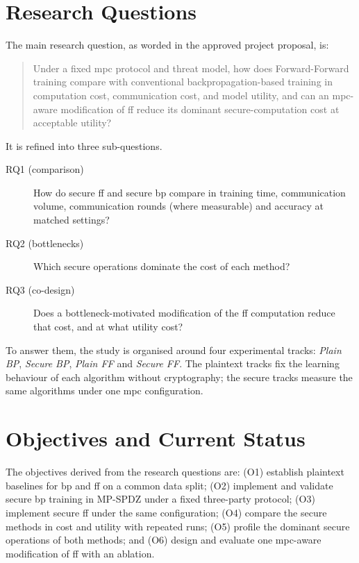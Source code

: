 \section{Research Questions}\label{sec:intro-rq}
The main research question, as worded in the approved project proposal, is:

\begin{quote}
Under a fixed \ac{mpc} protocol and threat model, how does Forward-Forward training compare with conventional backpropagation-based training in computation cost, communication cost, and model utility, and can an \ac{mpc}-aware modification of \ac{ff} reduce its dominant secure-computation cost at acceptable utility?
\end{quote}

It is refined into three sub-questions.
\begin{description}
  \item[RQ1 (comparison)] How do secure \ac{ff} and secure \ac{bp} compare in training time, communication volume, communication rounds (where measurable) and accuracy at matched settings?
  \item[RQ2 (bottlenecks)] Which secure operations dominate the cost of each method?
  \item[RQ3 (co-design)] Does a bottleneck-motivated modification of the \ac{ff} computation reduce that cost, and at what utility cost?
\end{description}
To answer them, the study is organised around four experimental tracks: \emph{Plain BP}, \emph{Secure BP}, \emph{Plain FF} and \emph{Secure FF}. The plaintext tracks fix the learning behaviour of each algorithm without cryptography; the secure tracks measure the same algorithms under one \ac{mpc} configuration.

\section{Objectives and Current Status}\label{sec:intro-status}
The objectives derived from the research questions are: (O1) establish plaintext baselines for \ac{bp} and \ac{ff} on a common data split; (O2) implement and validate secure \ac{bp} training in MP-SPDZ under a fixed three-party protocol; (O3) implement secure \ac{ff} under the same configuration; (O4) compare the secure methods in cost and utility with repeated runs; (O5) profile the dominant secure operations of both methods; and (O6) design and evaluate one \ac{mpc}-aware modification of \ac{ff} with an ablation.

